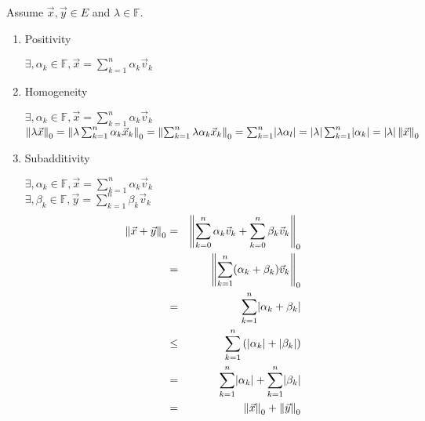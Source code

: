 \documentclass[letterpaper,12pt,fleqn]{article}
\newcommand{\nnorm}[2]{\left\|#1\right\|_{#2}}
\newcommand{\vv}{\vec{v}}
\newcommand{\vx}{\vec{x}}
\newcommand{\vy}{\vec{y}}
\newcommand{\vo}{\vec{0}}
\newcommand{\F}{\mathbb{F}}
\renewcommand{\a}{\alpha}
\renewcommand{\b}{\beta}
\renewcommand{\l}{\lambda}
\begin{document}
\begin{theproof}
  Assume $\vx,\vy\in E$ and $\l\in\F$.
  \begin{enumerate}
  \item Positivity

    $\exists,\a_k\in\F,\vx=\sum_{k=1}^n\a_k\vv_k$


  \item Homogeneity

    $\exists,\a_k\in\F,\vx=\sum_{k=1}^n\a_k\vv_k$ \\
    $\nnorm{\l\vx}{0}=\nnorm{\l\sum_{k=1}^n\a_k\vx_k}{0}=
    \nnorm{\sum_{k=1}^n\l\a_k\vx_k}{0}=\sum_{k=1}^n\abs{\l\a_l}=
    \abs{\l}\sum_{k=1}^n\abs{\a_k}=\abs{\l}\nnorm{\vx}{0}$

  \item Subadditivity
    
    $\exists,\a_k\in\F,\vx=\sum_{k=1}^n\a_k\vv_k$ \\
    $\exists,\b_k\in\F,\vy=\sum_{k=1}^n\b_k\vv_k$
    \begin{eqnarray*}
      \nnorm{\vx+\vy}{0} &=&
      \nnorm{\sum_{k=0}^n\a_k\vv_k+\sum_{k=0}^n\b_k\vv_k}{0} \\
      &=& \nnorm{\sum_{k=1}^n(\a_k+\b_k)\vv_k}{0} \\
      &=& \sum_{k=1}^n\abs{\a_k+\b_k} \\
      &\le& \sum_{k=1}^n\left(\abs{\a_k}+\abs{\b_k}\right) \\
      &=& \sum_{k=1}^n\abs{\a_k}+\sum_{k=1}^n\abs{\b_k} \\
      &=& \nnorm{\vx}{0}+\nnorm{\vy}{0}
    \end{eqnarray*}
  \end{enumerate}
\end{theproof}
\end{document}
